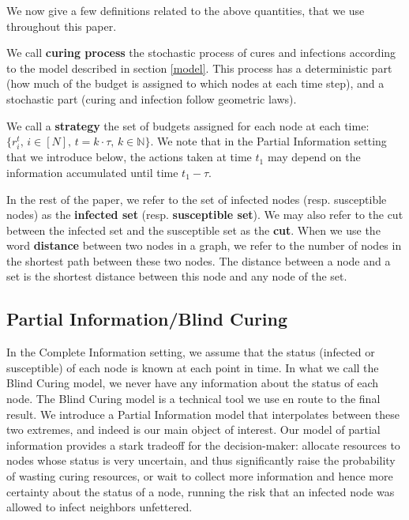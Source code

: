 We now give a few definitions related to the above quantities, that we use throughout this paper.

\begin{definition}
We call \textbf{curing process} the stochastic process of cures and infections according to the model described in section \ref{model}. This process has a deterministic part (how much of the budget is assigned to which nodes at each time step), and a stochastic part (curing and infection follow geometric laws).
\end{definition}

\begin{definition}
We call a \textbf{strategy} the set of budgets assigned for each node at each time: $\{ r_i^t,\, i\in [N],\, t = k\cdot \tau, \, k \in \mathbb{N}\}$. We note that in the Partial Information setting that we introduce below, the actions taken at time $t_1$ may depend on the information accumulated until time $t_1 - \tau$. 
\end{definition}

In the rest of the paper, we refer to the set of infected nodes (resp. susceptible nodes) as the \textbf{infected set} (resp. \textbf{susceptible set}). We may also refer to the cut between the infected set and the susceptible set as the \textbf{cut}. When we use the word \textbf{distance} between two nodes in a graph, we refer to the number of nodes in the shortest path between these two nodes. The distance between a node and a set is the shortest distance between this node and any node of the set.



\subsection{Partial Information/Blind Curing}
In the Complete Information setting, we assume that the status (infected or susceptible) of each node is known at each point in time. In what we call the Blind Curing model, we never have any information about the status of each node. The Blind Curing model is a technical tool we use en route to the final result. We introduce a Partial Information model that interpolates between these two extremes, and indeed is our main object of interest. Our model of partial information provides a stark tradeoff for the decision-maker: allocate resources to nodes whose status is very uncertain, and thus significantly raise the probability of wasting curing resources, or wait to collect more information and hence more certainty about the status of a node, running the risk that an infected node was allowed to infect neighbors unfettered. 

